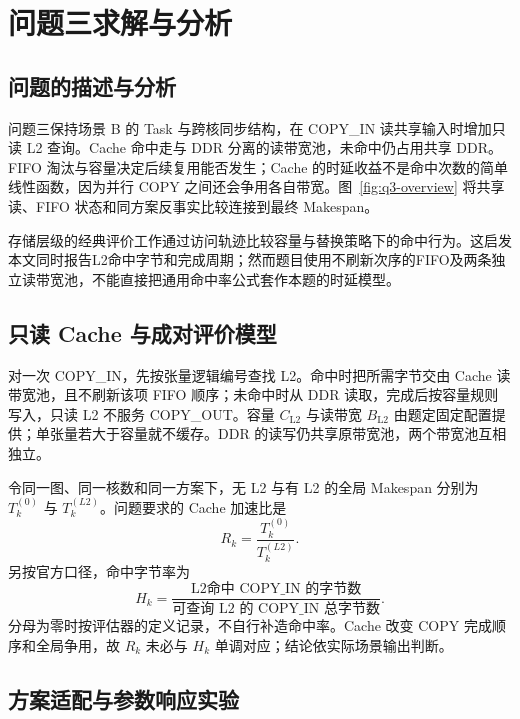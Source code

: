 \section{问题三求解与分析}
\subsection{问题的描述与分析}

问题三保持场景 B 的 Task 与跨核同步结构，在 COPY\_IN 读共享输入时增加只读 L2 查询。Cache 命中走与 DDR 分离的读带宽池，未命中仍占用共享 DDR。FIFO 淘汰与容量决定后续复用能否发生；Cache 的时延收益不是命中次数的简单线性函数，因为并行 COPY 之间还会争用各自带宽。图~\ref{fig:q3-overview} 将共享读、FIFO 状态和同方案反事实比较连接到最终 Makespan。



存储层级的经典评价工作通过访问轨迹比较容量与替换策略下的命中行为\cite{mattson1970}。这启发本文同时报告L2命中字节和完成周期；然而题目使用不刷新次序的FIFO及两条独立读带宽池，不能直接把通用命中率公式套作本题的时延模型。

\subsection{只读 Cache 与成对评价模型}

对一次 COPY\_IN，先按张量逻辑编号查找 L2。命中时把所需字节交由 Cache 读带宽池，且不刷新该项 FIFO 顺序；未命中时从 DDR 读取，完成后按容量规则写入，只读 L2 不服务 COPY\_OUT。容量 $C_{\mathrm{L2}}$ 与读带宽 $B_{\mathrm{L2}}$ 由题定固定配置提供；单张量若大于容量就不缓存。DDR 的读写仍共享原带宽池，两个带宽池互相独立。

令同一图、同一核数和同一方案下，无 L2 与有 L2 的全局 Makespan 分别为 $T_k^{(0)}$ 与 $T_k^{(L2)}$。问题要求的 Cache 加速比是
\begin{equation}\label{eq:q3-cache-gain}
R_k=\frac{T_k^{(0)}}{T_k^{(L2)}}.
\end{equation}
另按官方口径，命中字节率为
\begin{equation}\label{eq:q3-hit-rate}
H_k=\frac{\text{L2命中 COPY\_IN 的字节数}}{\text{可查询 L2 的 COPY\_IN 总字节数}}.
\end{equation}
分母为零时按评估器的定义记录，不自行补造命中率。Cache 改变 COPY 完成顺序和全局争用，故 $R_k$ 未必与 $H_k$ 单调对应；结论依实际场景输出判断。

\subsection{方案适配与参数响应实验}

